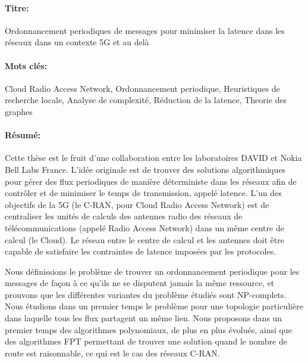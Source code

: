\documentclass[12pt,a4paper]{book}
\begin{document}
\begin{mdframed}[linecolor=Prune,linewidth=1]
\vspace{-.25cm}
\paragraph*{Titre:} Ordonnancement periodiques de messages pour minimiser la latence dans les réseaux dans un contexte 5G et au delà


\begin{small}
\vspace{-.25cm}
\paragraph*{Mots clés:}  Cloud Radio Access Network, Ordonnancement periodique, Heuristiques de recherche locale, Analyse de complexité, Réduction de la latence, Theorie des graphes

\vspace{-.5cm}
\begin{multicols}{2}
\paragraph*{Résumé:} Cette thèse est le fruit d’une collaboration entre les laboratoires DAVID et Nokia Bell Labs France.
L’idée originale est de trouver des solutions algorithmiques pour gérer des flux periodiques de manière déterministe dans les réseaux afin de contrôler et de minimiser le temps de transmission, appelé latence. L’un des objectifs de la 5G (le C-RAN, pour Cloud Radio Access Network) est de centraliser les unités de calculs des antennes radio des réseaux de télécommunications (appelé Radio Access Network) dans un même centre de calcul (le Cloud). Le réseau entre le centre de calcul et les antennes doit être capable de satisfaire les contraintes de latence imposées par les protocoles.

Nous définissions le problème de trouver un ordonnancement periodique pour les messages de façon à ce qu'ils ne se disputent jamais la même ressource, et prouvons que les différentes variantes du problème étudiés sont NP-complets. Nous étudions dans un premier temps le problème pour une topologie particulière dans laquelle tous les flux partagent un même lien. Nous proposons dans un premier temps des algorithmes polynomiaux, de plus en plus évolués, ainsi que des algorithmes FPT permettant de trouver une solution quand le nombre de route est raisonnable, ce qui est le cas des réseaux C-RAN.


\end{multicols}
\end{small}
\end{mdframed}
\end{document}

